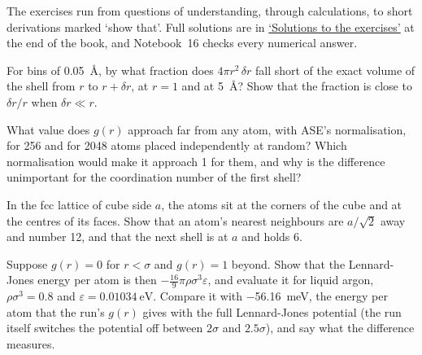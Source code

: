 \label{sec:ob-exercises}

The exercises run from questions of understanding, through calculations,
to short derivations marked `show that'. Full solutions are in
\hyperref[sec:ob-solutions]{`Solutions to the exercises'} at the end of
the book, and Notebook~16 checks every numerical answer.

\begin{exercise}
\label{ex:ob-shell}
For bins of \SI{0.05}{\angstrom}, by what fraction does $4\pi r^2\,\delta r$
fall short of the exact volume of the shell from $r$ to $r + \delta r$,
at $r = 1$ and at \SI{5}{\angstrom}? Show that the fraction is close to
$\delta r/r$ when $\delta r \ll r$.
\end{exercise}

\begin{exercise}
\label{ex:ob-far}
What value does $g(r)$ approach far from any atom, with ASE's
normalisation, for 256 and for 2048 atoms placed independently at random?
Which normalisation would make it approach 1 for them, and why is the
difference unimportant for the coordination number of the first shell?
\end{exercise}

\begin{exercise}
\label{ex:ob-fcc}
In the fcc lattice of cube side $a$, the atoms sit at the corners of the
cube and at the centres of its faces. Show that an atom's nearest
neighbours are $a/\sqrt2$ away and number 12, and that the next shell is
at $a$ and holds 6.
\end{exercise}

\begin{exercise}
\label{ex:ob-meanfield}
Suppose $g(r) = 0$ for $r < \sigma$ and $g(r) = 1$ beyond. Show that the
Lennard-Jones energy per atom is then $-\frac{16}{9}\pi\rho\sigma^3
\varepsilon$, and evaluate it for liquid argon, $\rho\sigma^3 = 0.8$ and
$\varepsilon = \SI{0.01034}{\electronvolt}$. Compare it with
\SI{-56.16}{\milli\electronvolt}, the energy per atom that the run's $g(r)$
gives with the full Lennard-Jones potential (the run itself switches the
potential off between $2\sigma$ and $2.5\sigma$), and say what the
difference measures.
\end{exercise}

